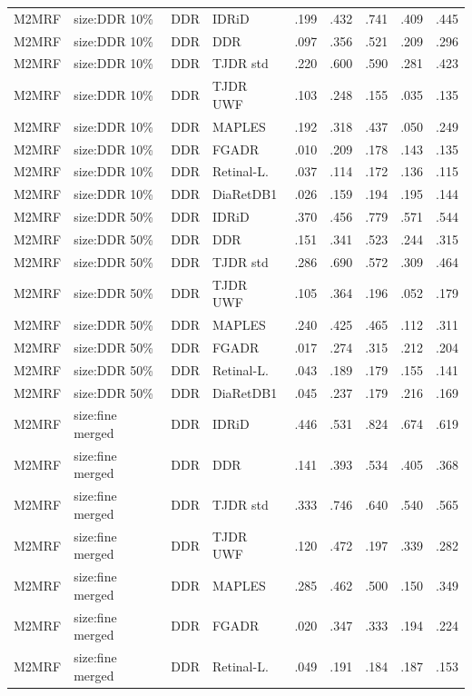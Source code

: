 \begin{landscape}
{\begin{longtable}{l l l l c c c c c}
M2MRF & size:DDR 10\% & DDR & IDRiD & .199 & .432 & .741 & .409 & .445 \\
M2MRF & size:DDR 10\% & DDR & DDR & .097 & .356 & .521 & .209 & .296 \\
M2MRF & size:DDR 10\% & DDR & TJDR std & .220 & .600 & .590 & .281 & .423 \\
M2MRF & size:DDR 10\% & DDR & TJDR UWF & .103 & .248 & .155 & .035 & .135 \\
M2MRF & size:DDR 10\% & DDR & MAPLES & .192 & .318 & .437 & .050 & .249 \\
M2MRF & size:DDR 10\% & DDR & FGADR & .010 & .209 & .178 & .143 & .135 \\
M2MRF & size:DDR 10\% & DDR & Retinal-L. & .037 & .114 & .172 & .136 & .115 \\
M2MRF & size:DDR 10\% & DDR & DiaRetDB1 & .026 & .159 & .194 & .195 & .144 \\
M2MRF & size:DDR 50\% & DDR & IDRiD & .370 & .456 & .779 & .571 & .544 \\
M2MRF & size:DDR 50\% & DDR & DDR & .151 & .341 & .523 & .244 & .315 \\
M2MRF & size:DDR 50\% & DDR & TJDR std & .286 & .690 & .572 & .309 & .464 \\
M2MRF & size:DDR 50\% & DDR & TJDR UWF & .105 & .364 & .196 & .052 & .179 \\
M2MRF & size:DDR 50\% & DDR & MAPLES & .240 & .425 & .465 & .112 & .311 \\
M2MRF & size:DDR 50\% & DDR & FGADR & .017 & .274 & .315 & .212 & .204 \\
M2MRF & size:DDR 50\% & DDR & Retinal-L. & .043 & .189 & .179 & .155 & .141 \\
M2MRF & size:DDR 50\% & DDR & DiaRetDB1 & .045 & .237 & .179 & .216 & .169 \\
M2MRF & size:fine merged & DDR & IDRiD & .446 & .531 & .824 & .674 & .619 \\
M2MRF & size:fine merged & DDR & DDR & .141 & .393 & .534 & .405 & .368 \\
M2MRF & size:fine merged & DDR & TJDR std & .333 & .746 & .640 & .540 & .565 \\
M2MRF & size:fine merged & DDR & TJDR UWF & .120 & .472 & .197 & .339 & .282 \\
M2MRF & size:fine merged & DDR & MAPLES & .285 & .462 & .500 & .150 & .349 \\
M2MRF & size:fine merged & DDR & FGADR & .020 & .347 & .333 & .194 & .224 \\
M2MRF & size:fine merged & DDR & Retinal-L. & .049 & .191 & .184 & .187 & .153 \\

\end{longtable}}
\end{landscape}

